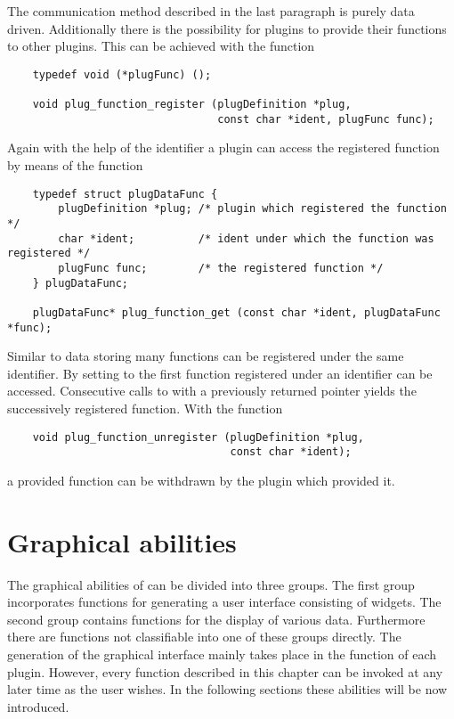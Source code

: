 The communication method described in the last paragraph is purely
data driven. Additionally there is the possibility for plugins to
provide their functions to other plugins. This can be achieved with
the function
\begin{small}
\linespread{0.9}
\begin{verbatim}
    typedef void (*plugFunc) ();

    void plug_function_register (plugDefinition *plug,
                                 const char *ident, plugFunc func);
\end{verbatim}
\end{small}
Again with the help of the identifier  a plugin can
access the registered function by means of the function
\begin{small}
\linespread{0.9}
\begin{verbatim}
    typedef struct plugDataFunc {
        plugDefinition *plug; /* plugin which registered the function */
        char *ident;          /* ident under which the function was registered */
        plugFunc func;        /* the registered function */
    } plugDataFunc;

    plugDataFunc* plug_function_get (const char *ident, plugDataFunc *func);
\end{verbatim}
\end{small}
Similar to data storing many functions can be registered under the
same identifier. By setting  to  the first
function registered under an identifier can be accessed. Consecutive
calls to  with a previously returned
pointer yields the successively registered function. With the
function
\begin{small}
\linespread{0.9}
\begin{verbatim}
    void plug_function_unregister (plugDefinition *plug,
                                   const char *ident);
\end{verbatim}
\end{small}
a provided function can be withdrawn by the plugin which provided
it. 

\section{Graphical abilities}
\label{sec:p_gui}

The graphical abilities of \icewing{} can be divided into three
groups. The first group incorporates functions for generating a
user interface consisting of widgets. The second group
contains functions for the display of various data. Furthermore
there are functions not classifiable into one of these groups
directly. The generation of the graphical interface mainly takes
place in the  function of each plugin. However,
every function described in this chapter can be invoked at any later
time as the user wishes. In the following sections these abilities
will be now introduced.

